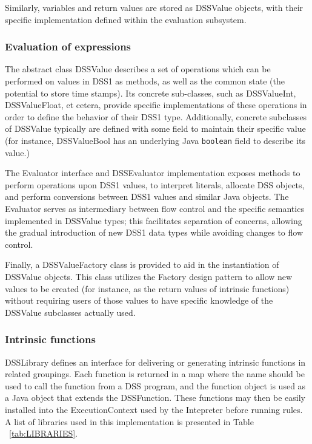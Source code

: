 \documentclass[12pt,letterpaper]{article}
\begin{document}
{Similarly, variables and return values are stored as DSSValue 
objects, with their specific implementation defined within the 
evaluation subsystem.

\subsubsection{Evaluation of expressions} \label{sec:EVALUATION}

The abstract class DSSValue describes a set of operations which can be performed on values in DSS1 as methods, as well as the common state (the potential to store time stamps). Its concrete sub-classes, such as DSSValueInt, DSSValueFloat, et cetera, provide specific implementations of these operations in order to define the behavior of their DSS1 type. Additionally, concrete subclasses of DSSValue typically are defined with some field to maintain their specific value (for instance, DSSValueBool has an underlying Java \texttt{boolean} field to describe its value.)

The Evaluator interface and DSSEvaluator implementation exposes methods to perform operations upon DSS1 values, to interpret literals, allocate DSS objects, and perform conversions between DSS1 values and similar Java objects. The Evaluator serves as intermediary between flow control and the specific semantics implemented in DSSValue types; this facilitates separation of concerns, allowing the gradual introduction of new DSS1 data types while avoiding changes to  flow control.

Finally, a DSSValueFactory class is provided to aid in the instantiation of DSSValue objects. This class utilizes the Factory design pattern to allow new values to be created (for instance, as the return values of intrinsic functions) without requiring users of those values to have specific knowledge of the DSSValue subclasses actually used.

\subsubsection{Intrinsic functions} \label{sec:INTRINSIC_FUNCTIONS}

DSSLibrary defines an interface for delivering or generating intrinsic functions in related groupings. Each function is returned in a map where the name should be used to call the function from a DSS program, and the function object is used as a Java object that extends the DSSFunction. These functions may then be easily installed into the ExecutionContext used by the Intepreter before running rules. A list of libraries used in this implementation is presented in Table ~\ref{tab:LIBRARIES}.

}
\end{document}
